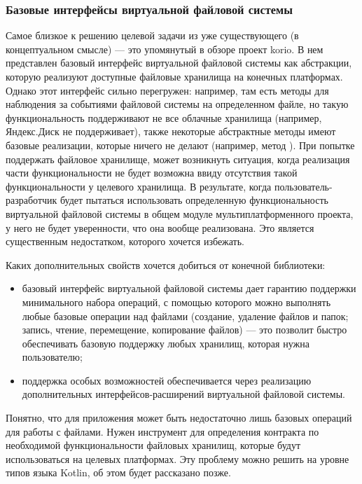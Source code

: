   \subsubsection{Базовые интерфейсы виртуальной файловой системы}\label{lib-arch-basic-interfaces}
    Самое близкое к решению целевой задачи из уже существующего (в концептуальном смысле) --- это упомянутый в обзоре проект korio\cite{gh-korio}. В нем представлен базовый интерфейс виртуальной файловой системы как абстракции, которую реализуют доступные файловые хранилища на конечных платформах. Однако этот интерфейс сильно перегружен: например, там есть методы для наблюдения за событиями файловой системы на определенном файле, но такую функциональность поддерживают не все облачные хранилища (например, Яндекс.Диск не поддерживает), также некоторые абстрактные методы имеют базовые реализации, которые ничего не делают (например, метод ). При попытке поддержать файловое хранилище, может возникнуть ситуация, когда реализация части функциональности не будет возможна ввиду отсутствия такой функциональности у целевого хранилища. В результате, когда пользователь-разработчик будет пытаться использовать определенную функциональность виртуальной файловой системы в общем модуле мультиплатформенного проекта, у него не будет уверенности, что она вообще реализована. Это является существенным недостатком, которого хочется избежать.

    Каких дополнительных свойств хочется добиться от конечной библиотеки: 
    \begin{itemize}
    \item базовый интерфейс виртуальной файловой системы дает гарантию поддержки минимального набора операций, с помощью которого можно выполнять любые базовые операции над файлами (создание, удаление файлов и папок; запись, чтение, перемещение, копирование файлов) --- это позволит быстро обеспечивать базовую поддержку любых хранилищ, которая нужна пользователю;
    \item поддержка особых возможностей обеспечивается через реализацию дополнительных интерфейсов-расширений виртуальной файловой системы.
    \end{itemize}
    Понятно, что для приложения может быть недостаточно лишь базовых операций для работы с файлами. Нужен инструмент для определения контракта по необходимой функциональности файловых хранилищ, которые будут использоваться на целевых платформах. Эту проблему можно решить на уровне типов языка Kotlin, об этом будет рассказано позже.

